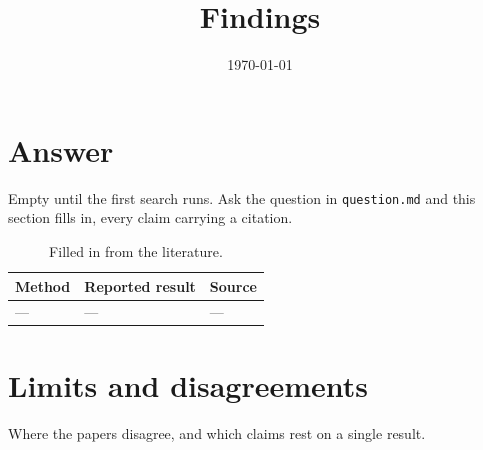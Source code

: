 \documentclass{article}
\title{Findings}
\date{\today}
\begin{document}
\maketitle

\section{Answer}

Empty until the first search runs. Ask the question in \texttt{question.md}
and this section fills in, every claim carrying a citation.

\begin{table}[h]
  \centering
  \begin{tabular}{lll}
    \toprule
    Method & Reported result & Source \\
    \midrule
    --- & --- & --- \\
    \bottomrule
  \end{tabular}
  \caption{Filled in from the literature.}
\end{table}

\section{Limits and disagreements}

Where the papers disagree, and which claims rest on a single result.
\end{document}
